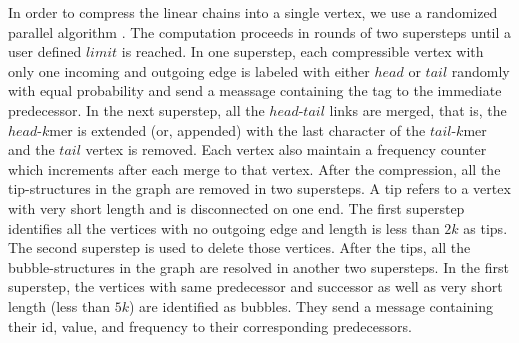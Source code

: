 \documentclass[conference]{IEEEtran}
\begin{document}
In order to compress the linear chains into a single vertex, we use a randomized parallel algorithm \cite{algo:parallellistrank}.
The computation proceeds in rounds of two supersteps until a user defined $limit$ is reached.
In one superstep, each compressible vertex with only one incoming and outgoing edge is labeled with either $head$ or $tail$ randomly with equal probability and send a meassage containing the tag to the immediate predecessor.
In the next superstep, all the $head$-$tail$ links are merged, that is, the $head$-$k$mer is extended (or, appended) with the last character of the $tail$-$k$mer and the $tail$ vertex is removed.
Each vertex also maintain a frequency counter which increments after each merge to that vertex.
After the compression, all the tip-structures in the graph are removed in two supersteps.
A tip refers to a vertex with very short length and is disconnected on one end.
The first superstep identifies all the vertices with no outgoing edge and  length is less than $2k$ as tips.
The second superstep is used to delete those vertices.
After the tips, all the bubble-structures in the graph are resolved in another two supersteps.
In the first superstep, the vertices with same predecessor and successor as well as very short length (less than $5k$) are identified as bubbles. They send a message containing their id, value, and frequency to their corresponding predecessors. 
\end{document}
